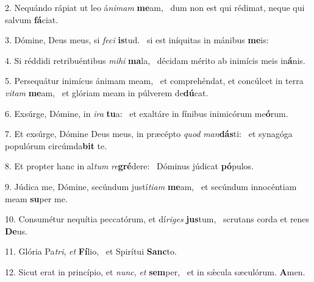 2. Nequándo rápiat ut leo á\textit{ni}\textit{mam} \textbf{me}am, \ast\  dum non est qui rédimat, neque qui salvum \textbf{fá}ciat.\

3. Dómine, Deus meus, si \textit{fe}\textit{ci} \textbf{is}tud. \ast\  si est iníquitas in mánibus \textbf{me}is:\

4. Si réddidi retribuéntibus \textit{mi}\textit{hi} \textbf{ma}la, \ast\  décidam mérito ab inimícis meis in\textbf{á}nis.\

5. Persequátur inimícus ánimam meam, \dag\  et comprehéndat, et concúlcet in terra \textit{vi}\textit{tam} \textbf{me}am, \ast\  et glóriam meam in púlverem de\textbf{dú}cat.\

6. Exsúrge, Dómine, in \textit{i}\textit{ra} \textbf{tu}a: \ast\  et exaltáre in fínibus inimicórum me\textbf{ó}rum.\

7. Et exsúrge, Dómine Deus meus, in præcépto \textit{quod} \textit{man}\textbf{dás}ti: \ast\  et synagóga populórum circúmda\textbf{bit} te.\

8. Et propter hanc in al\textit{tum} \textit{re}\textbf{gré}dere: \ast\  Dóminus júdicat \textbf{pó}pulos.\

9. Júdica me, Dómine, secúndum justí\textit{ti}\textit{am} \textbf{me}am, \ast\  et secúndum innocéntiam meam \textbf{su}per me.\

10. Consumétur nequítia peccatórum, et dí\textit{ri}\textit{ges} \textbf{jus}tum, \ast\  scrutans corda et renes \textbf{De}us.\

11. Glória Pa\textit{tri}, \textit{et} \textbf{Fí}lio, \ast\  et Spirítui \textbf{Sanc}to.\

12. Sicut erat in princípio, et \textit{nunc}, \textit{et} \textbf{sem}per, \ast\  et in sǽcula sæculórum. \textbf{A}men.\

